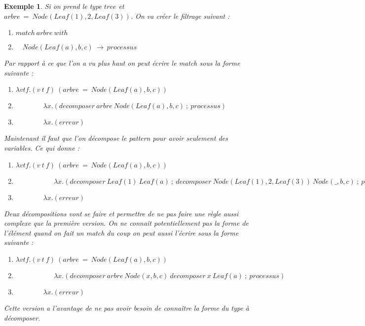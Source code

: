 \documentclass[10pt,a4paper]{report}
\newtheorem{ex}{Exemple}
\begin{document}
	\begin{ex}
		Si on prend le type $tree$ et $arbre~=~Node(Leaf(1),2,Leaf(3))$. 
		On va créer le filtrage suivant : 
		\smallbreak
		\begin{enumerate}
			\item $match~arbre~with$
			\item $\quad Node(Leaf(a),b,c)~\rightarrow~processus$
		\end{enumerate}
		\bigbreak
		
		Par rapport à ce que l'on a vu plus haut on peut écrire le match sous la forme suivante :
		\smallbreak
		\begin{enumerate}
			\item $\lambda vtf.(v~t~f)~(arbre~=~Node(Leaf(a),b,c))$
			\item $~~~~~~~~~~~~~~~~~~ \lambda x.(decomposer~arbre~Node(Leaf(a),b,c)~;~processus)$
			\item $~~~~~~~~~~~~~~~~~~ \lambda x.(erreur)$
		\end{enumerate}
		\bigbreak
		
		
		Maintenant il faut que l'on décompose le pattern pour avoir seulement des variables. Ce qui donne :
		\smallbreak
		\begin{enumerate}
			\item $\lambda vtf.(v~t~f)~(arbre~=~Node(Leaf(a),b,c))$
			\item $~~~~~~~~~~~~~~~~~~~~~~~~~\lambda x.(decomposer~Leaf(1)~Leaf(a)~;~decomposer~Node(Leaf(1),2,Leaf(3))~Node(\_,b,c)~;~processus)$
			\item $~~~~~~~~~~~~~~~~~~ \lambda x.(erreur)$
		\end{enumerate} 
		\bigbreak
		
		Deux décompositions vont se faire et permettre de ne pas faire une règle aussi complexe que la première version. On ne connaît potentiellement pas la forme de l'élément quand on fait un match du coup on peut aussi l'écrire sous la forme suivante :
		\smallbreak
		\begin{enumerate}
			\item $\lambda vtf.(v~t~f)~(arbre~=~Node(Leaf(a),b,c))$
			\item $~~~~~~~~~~~~~~~~~~~~~~~~~\lambda x.(decomposer~arbre~Node(x,b,c)~decomposer~x~Leaf(a)~;~processus)$
			\item $~~~~~~~~~~~~~~~~~~ \lambda x.(erreur)$
		\end{enumerate} 
		\medbreak
		
		Cette version a l'avantage de ne pas avoir besoin de connaître la forme du type à décomposer.
	\end{ex}
	\bigbreak
	
\end{document}
